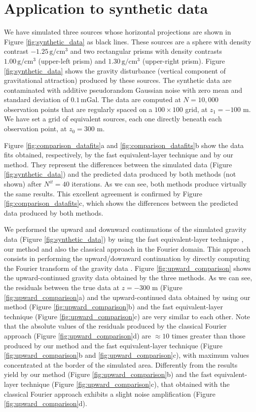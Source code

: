 \section{Application to synthetic data}

We have simulated three sources whose horizontal projections are shown in 
Figure \ref{fig:synthetic_data} as black lines. 
These sources are a sphere with density contrast  
$-1.25\, \mathrm{g/cm^3}$ and two rectangular prisms with density contrasts 
$1.00\, \mathrm{g/cm^3}$ (upper-left prism) 
and $1.30\, \mathrm{g/cm^3}$ (upper-right prism). 
Figure \ref{fig:synthetic_data} shows the gravity disturbance (vertical component of 
gravitational attraction) produced by these sources. 
The synthetic data are contaminated with additive pseudorandom Gaussian 
noise with zero mean and standard deviation of $0.1 \, \mathrm{mGal}$.
The data are computed at $N = 10,000$ observation points that are regularly spaced on a 
$100 \times 100$ grid, at $z_{1} = -100$ m. 
We have set a grid of equivalent sources, each one directly beneath each 
observation point, at $z_{0} = 300$ m. 

Figure \ref{fig:comparison_datafits}a and \ref{fig:comparison_datafits}b show the data fits 
obtained, respectively, by the fast equivalent-layer technique \citep{siqueira-etal2017} 
and by our method. They represent the differences between the simulated data (Figure \ref{fig:synthetic_data}) and the predicted data produced by both methods 
(not shown) after $N^{it} = 40$ iterations. 
As we can see, both methods produce virtually the same results.
This excellent agreement is confirmed by Figure \ref{fig:comparison_datafits}c, which shows 
the differences between the predicted data produced by both methods.

We performed the upward and downward continuations of the simulated gravity data 
(Figure \ref{fig:synthetic_data}) by using the fast equivalent-layer technique
\citep{siqueira-etal2017}, our method and also the classical approach in the 
Fourier domain. This approach consists in performing the upward/downward continuation 
by directly computing the Fourier transform of the gravity data 
\citep[e.g., ][ p. 317]{blakely1996}.
Figure \ref{fig:upward_comparison} shows the upward-continued gravity data 
obtained by the three methods.
As we can see, the residuals between the true data at $z = -300$ m 
(Figure \ref{fig:upward_comparison}a) and the upward-continued data obtained by 
using our method (Figure \ref{fig:upward_comparison}b) and 
the fast equivalent-layer technique (Figure \ref{fig:upward_comparison}c) are very similar 
to each other.
Note that the absolute values of the residuals produced by the classical Fourier 
approach (Figure \ref{fig:upward_comparison}d) are $\approx 10$ times greater than
those produced by our method and the fast equivalent-layer technique 
(Figure \ref{fig:upward_comparison}b and \ref{fig:upward_comparison}c), 
with maximum values concentrated at the border of the simulated area.
Differently from the results yield by our method (Figure \ref{fig:upward_comparison}b) 
and the fast equivalent-layer technique (Figure \ref{fig:upward_comparison}c), 
that obtained with the classical Fourier approach exhibits a slight noise 
amplification (Figure \ref{fig:upward_comparison}d).

